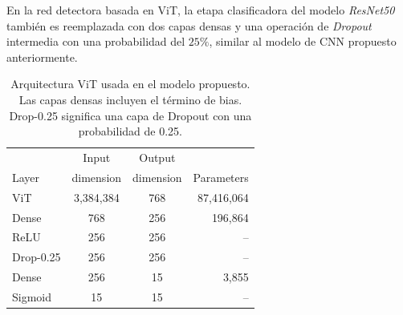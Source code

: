 En la red detectora basada en ViT, la etapa clasificadora del modelo \textit{ResNet50} también es
reemplazada con dos capas densas y una operación de \textit{Dropout} intermedia con una probabilidad
del $25\%$, similar al modelo de CNN propuesto anteriormente.


\begin{table}[!ht]
    \centering
    \begin{tabular}{| l|c | c | r |}
    \hline
                 &     Input   &  Output    &  \\
    Layer        &   dimension & dimension  & Parameters \\
    \hline\hline
    ViT     &     3,384,384 &     768 & 87,416,064 \\
    Dense        &     768        &     256      & 196,864    \\
    ReLU         &     256         &     256      & --         \\
    Drop-0.25  &     256         &     256      & --         \\
    Dense        &     256         &     15       &  3,855     \\
    Sigmoid      &     15          &     15       & --         \\
    \hline
    \end{tabular}
    \caption{Arquitectura ViT usada en el modelo propuesto. Las capas densas incluyen el término de bias.
    Drop-0.25 significa una capa de Dropout con una probabilidad de 0.25.}
    \label{table_ViT}
\end{table}

